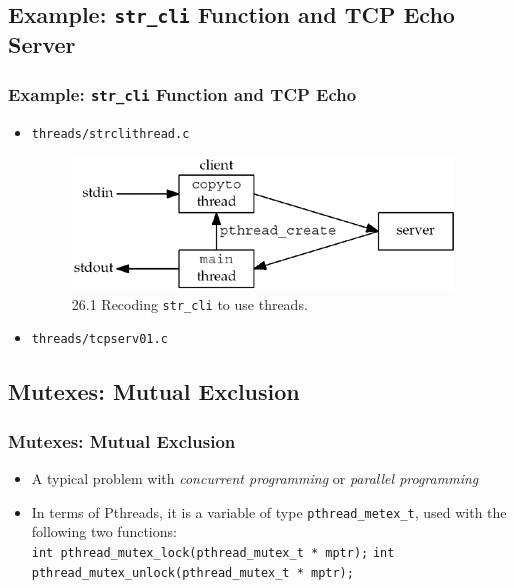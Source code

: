 \documentclass[notes,serif]{beamer}
\begin{document}
\subsection{Example: \texttt{str\_cli} Function and TCP Echo Server}
\begin{frame}
  \frametitle{Example: \texttt{str\_cli} Function and TCP Echo}
  \begin{itemize}
    \item \texttt{threads/strclithread.c} \\
      \begin{figure}
        \includegraphics[width=.5\textwidth]{figs/26fig01}
        \caption{26.1 Recoding \texttt{str\_cli} to use threads.}
      \end{figure}
    \item \texttt{threads/tcpserv01.c}
  \end{itemize}
\end{frame}

\subsection{Mutexes: Mutual Exclusion}
\begin{frame}[containsverbatim]
  \frametitle{Mutexes: Mutual Exclusion}
  \begin{itemize}
    \item A typical problem with \textit{concurrent programming} or \textit{parallel programming}
    \item In terms of Pthreads, it is a variable of type \texttt{pthread\_metex\_t}, used with the following two functions: \\
        {\scriptsize
      \verb+int pthread_mutex_lock(pthread_mutex_t * mptr);+
      \verb+int pthread_mutex_unlock(pthread_mutex_t * mptr);+
      }
  \end{itemize}
\end{frame}
\end{document}
